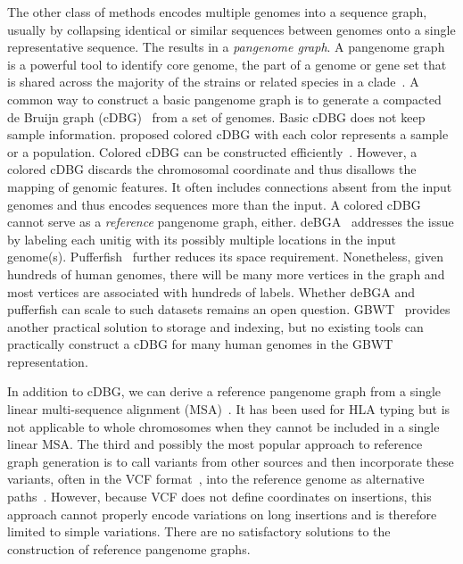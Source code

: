 \documentclass[twocolumn]{bmcart}
\begin{document}
The other class of methods encodes multiple genomes into a sequence graph,
usually by collapsing identical or similar sequences between genomes onto a
single representative sequence. The results in a \emph{pangenome graph}. A
pangenome graph is a powerful tool to identify core genome, the part of a
genome or gene set that is shared across the majority of the strains or related species
in a clade~\cite{Vernikos:2015aa}. A common way to construct a basic pangenome
graph is to generate a compacted de Bruijn graph
(cDBG)~\cite{Marcus:2014xy,Baier_2015,Beller:2016ab,Chikhi:2015aa,Minkin_2016,Chikhi_2016,almodaresi_et_al:LIPIcs:2017:7657}
from a set of genomes. Basic cDBG does not keep sample information.
\cite{Iqbal:2012aa} proposed colored cDBG with each color represents a sample
or a population. Colored cDBG can be constructed
efficiently~\cite{Muggli_2019,Holley695338}. However, a colored cDBG discards
the chromosomal coordinate and thus disallows the mapping of genomic features.
It often includes connections absent from the input genomes and thus encodes
sequences more than the input. A colored cDBG cannot serve as a
\emph{reference} pangenome graph, either.  deBGA~\cite{Liu:2016ac} addresses
the issue by labeling each unitig with its possibly multiple locations in the
input genome(s). Pufferfish~\cite{Almodaresi:2018aa} further reduces its space
requirement. Nonetheless, given hundreds of human genomes, there will be many
more vertices in the graph and most vertices are associated with hundreds of
labels. Whether deBGA and pufferfish can scale to such datasets remains an open
question. GBWT~\cite{Sir_n_2019} provides another practical solution to storage
and indexing, but no existing tools can practically construct a cDBG for many
human genomes in the GBWT representation.

In addition to cDBG, we can derive a reference pangenome
graph from a single linear multi-sequence alignment (MSA)~\cite{Dilthey_2015,Dilthey_2019}.
It has been used for HLA typing but is not applicable to whole chromosomes when
they cannot be included in a single linear MSA. The third and possibly the most
popular approach to reference graph generation is to call variants from other
sources and then incorporate these variants, often in the VCF format~\cite{Danecek:2011qy}, into
the reference genome as alternative
paths~\cite{Eggertsson:2017aa,Rakocevic_2019,Garrison:2018aa,Sibbesen:2018aa,Biederstedt:2018aa,Eggertsson_2019}.
However, because VCF does not define coordinates on insertions, this approach
cannot properly encode variations on long insertions and is therefore limited
to simple variations. There are no satisfactory solutions to the construction
of reference pangenome graphs.
\end{document}
